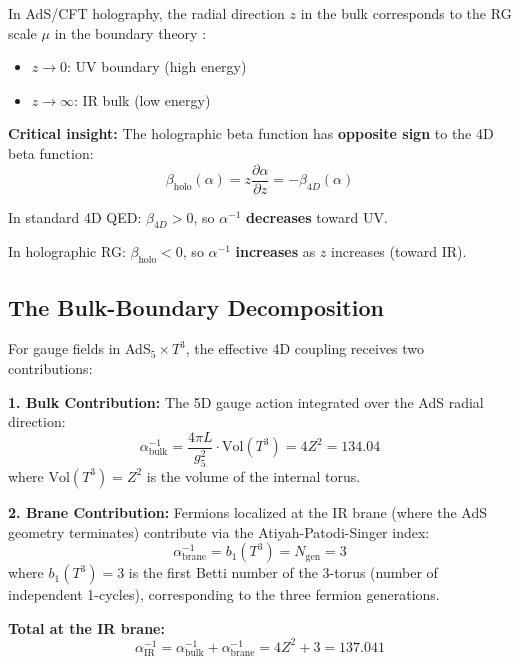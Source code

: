 \documentclass[12pt,a4paper]{article}
\newcommand{\Zsq}{Z^2}
\newcommand{\Ngen}{N_{\text{gen}}}
\begin{document}
In AdS/CFT holography, the radial direction $z$ in the bulk corresponds to the RG scale $\mu$ in the boundary theory \cite{Maldacena}:
\begin{itemize}
    \item $z \to 0$: UV boundary (high energy)
    \item $z \to \infty$: IR bulk (low energy)
\end{itemize}

\textbf{Critical insight:} The holographic beta function has \textbf{opposite sign} to the 4D beta function:
\begin{equation}
\beta_{\text{holo}}(\alpha) = z \frac{\partial \alpha}{\partial z} = -\beta_{4D}(\alpha)
\end{equation}

In standard 4D QED: $\beta_{4D} > 0$, so $\alpha^{-1}$ \textbf{decreases} toward UV.

In holographic RG: $\beta_{\text{holo}} < 0$, so $\alpha^{-1}$ \textbf{increases} as $z$ increases (toward IR).

\subsection{The Bulk-Boundary Decomposition}

For gauge fields in AdS$_5 \times T^3$, the effective 4D coupling receives two contributions:

\textbf{1. Bulk Contribution:} The 5D gauge action integrated over the AdS radial direction:
\begin{equation}
\alpha^{-1}_{\text{bulk}} = \frac{4\pi L}{g_5^2} \cdot \text{Vol}(T^3) = 4\Zsq = 134.04
\end{equation}
where $\text{Vol}(T^3) = \Zsq$ is the volume of the internal torus.

\textbf{2. Brane Contribution:} Fermions localized at the IR brane (where the AdS geometry terminates) contribute via the Atiyah-Patodi-Singer index:
\begin{equation}
\alpha^{-1}_{\text{brane}} = b_1(T^3) = \Ngen = 3
\end{equation}
where $b_1(T^3) = 3$ is the first Betti number of the 3-torus (number of independent 1-cycles), corresponding to the three fermion generations.

\textbf{Total at the IR brane:}
\begin{equation}
\boxed{\alpha^{-1}_{\text{IR}} = \alpha^{-1}_{\text{bulk}} + \alpha^{-1}_{\text{brane}} = 4\Zsq + 3 = 137.041}
\end{equation}
\end{document}
